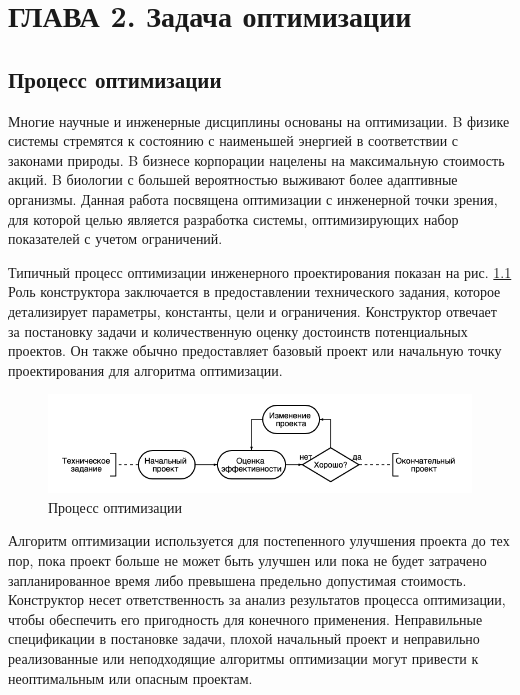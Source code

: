 \chapter{ ГЛАВА 2. Задача оптимизации}
\label{ch:chapter2}

\section{Процесс оптимизации}

Многие научные и инженерные дисциплины основаны на оптимизации. B физике системы стремятся к состоянию с наименьшей энергией в соответствии с законами природы. B бизнесе корпорации нацелены на максимальную стоимость акций. B биологии с большей вероятностью выживают более адаптивные организмы. Данная работа посвящена оптимизации с инженерной точки зрения, для которой целью является разработка системы, оптимизирующих набор показателей с учетом ограничений.

Типичный процесс оптимизации инженерного проектирования показан на рис. \ref{fig:diagram_1} Роль конструктора заключается в предоставлении технического задания, которое детализирует параметры, константы, цели и ограничения. Конструктор отвечает за постановку задачи и количественную оценку достоинств потенциальных проектов. Он также обычно предоставляет базовый проект или начальную точку проектирования для алгоритма оптимизации.

\begin{figure}[ht]
 \centering
		\includegraphics[height = 3 cm, keepaspectratio]{../assets/images/1_1_1diagram.png}
		\caption{ Процесс оптимизации }
		\label{fig:diagram_1}
	\end{figure}

Алгоритм оптимизации используется для постепенного улучшения проекта до тех пор, пока проект больше не может быть улучшен или пока не будет затрачено запланированное время либо превышена предельно допустимая стоимость. Конструктор несет ответственность за анализ результатов процесса оптимизации, чтобы обеспечить его пригодность для конечного применения. Неправильные спецификации в постановке задачи, плохой начальный проект и неправильно реализованные или неподходящие алгоритмы оптимизации могут привести к неоптимальным или опасным проектам.

